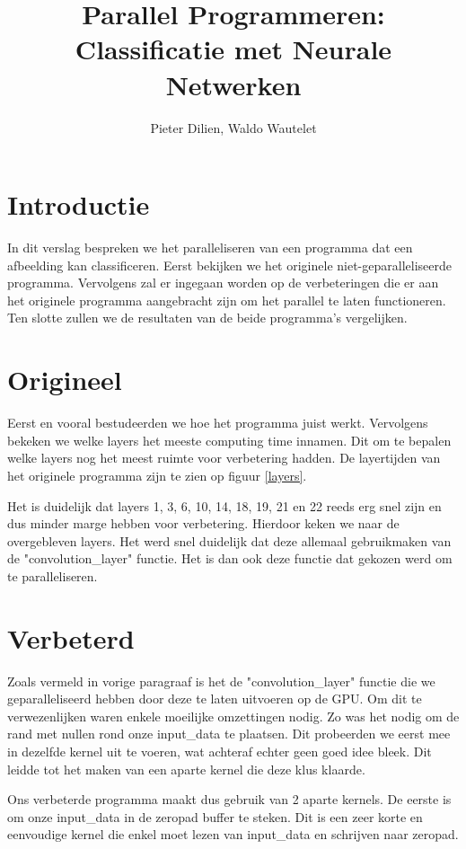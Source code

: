 \documentclass[a4paper, 12pt, one column]{article}
\title{Parallel Programmeren: Classificatie met Neurale Netwerken}
\author{Pieter Dilien, Waldo Wautelet}
\begin{document}
\maketitle

\section{Introductie}
In dit verslag bespreken we het paralleliseren van een programma dat een afbeelding kan classificeren.
Eerst bekijken we het originele niet-geparalleliseerde programma. Vervolgens zal er ingegaan worden op 
de verbeteringen die er aan het originele programma aangebracht zijn om het parallel te laten functioneren. Ten slotte
zullen we de resultaten van de beide programma's vergelijken.

\section{Origineel}
Eerst en vooral bestudeerden we hoe het programma juist werkt. Vervolgens bekeken we welke layers het meeste computing time 
innamen. Dit om te bepalen welke layers nog het meest ruimte voor verbetering hadden. De layertijden van het originele programma
zijn te zien op figuur \ref{layers}.

\medskip
\noindent
Het is duidelijk dat layers 1, 3, 6, 10, 14, 18, 19, 21 en 22 reeds erg snel zijn en dus minder marge hebben voor verbetering.
Hierdoor keken we naar de overgebleven layers. Het werd snel duidelijk dat deze allemaal gebruikmaken van de "convolution\_layer" functie.
Het is dan ook deze functie dat gekozen werd om te paralleliseren.

\section{Verbeterd}
Zoals vermeld in vorige paragraaf is het de "convolution\_layer" functie die we geparalleliseerd hebben door deze
te laten uitvoeren op de GPU. Om dit te verwezenlijken waren enkele moeilijke omzettingen nodig.
Zo was het nodig om de rand met nullen rond onze input\_data te plaatsen. Dit probeerden we eerst mee in dezelfde kernel 
uit te voeren, wat achteraf echter geen goed idee bleek. Dit leidde tot het maken van een aparte kernel die deze klus klaarde.

\medskip
\noindent
Ons verbeterde programma maakt dus gebruik van 2 aparte kernels. De eerste is om onze input\_data in de zeropad buffer te steken. 
Dit is een zeer korte en eenvoudige kernel die enkel moet lezen van input\_data en schrijven naar zeropad.
\end{document}
